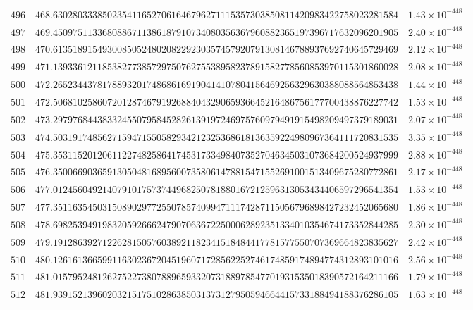 \documentclass[12pt,reqno]{amsart}
\theoremstyle{remark}
\begin{document}
\begin{longtable}{clc}
$496$ & $468.6302803338502354116527061646796271115357303850811420983422758023281584$ & $1.43\times 10^{-448}$ \\
$497$ & $469.4509751133680886711386187910734080356367960882365197396717632096201905$ & $2.40\times 10^{-448}$ \\
$498$ & $470.6135189154930085052480208229230357457920791308146788937692740645729469$ & $2.12\times 10^{-448}$ \\
$499$ & $471.1393361211853827738572975076275538958237891582778560853970115301860028$ & $2.08\times 10^{-448}$ \\
$500$ & $472.2652344378178893201748686169190414107804156469256329630388088564853438$ & $1.44\times 10^{-448}$ \\
$501$ & $472.5068102586072012874679192688404329065936645216486756177700438876227742$ & $1.53\times 10^{-448}$ \\
$502$ & $473.2979768443833245507958452826139197246975760979491915498209497379189031$ & $2.07\times 10^{-448}$ \\
$503$ & $474.5031917485627159471550582934212325368618136359224980967364111720831535$ & $3.35\times 10^{-448}$ \\
$504$ & $475.3531152012061122748258641745317334984073527046345031073684200524937999$ & $2.88\times 10^{-448}$ \\
$505$ & $476.3500669036591305048168956007358061478815471552691001513409675280772861$ & $2.17\times 10^{-448}$ \\
$506$ & $477.0124560492140791017573744968250781880167212596313053434406597296541354$ & $1.53\times 10^{-448}$ \\
$507$ & $477.3511635450315089029772550785740994711174287115056796898427232452065680$ & $1.86\times 10^{-448}$ \\
$508$ & $478.6982539491983205926662479070636722500062892351334010354674173352844285$ & $2.30\times 10^{-448}$ \\
$509$ & $479.1912863927122628150576038921182341518484417781577550707369664823835627$ & $2.42\times 10^{-448}$ \\
$510$ & $480.1261613665991163023672045196071728562252746174859174894774312893101016$ & $2.56\times 10^{-448}$ \\
$511$ & $481.0157952481262752273807889659332073188978547701931535018390572164211166$ & $1.79\times 10^{-448}$ \\
$512$ & $481.9391521396020321517510286385031373127950594664415733188494188376286105$ & $1.63\times 10^{-448}$ \\

\end{longtable}
\end{document}
